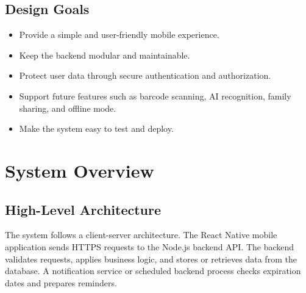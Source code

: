 \documentclass[12pt]{article}
\begin{document}
\subsection{Design Goals}
\begin{itemize}
    \item Provide a simple and user-friendly mobile experience.
    \item Keep the backend modular and maintainable.
    \item Protect user data through secure authentication and authorization.
    \item Support future features such as barcode scanning, AI recognition, family sharing, and offline mode.
    \item Make the system easy to test and deploy.
\end{itemize}

\section{System Overview}

\subsection{High-Level Architecture}
The system follows a client-server architecture. The React Native mobile application sends HTTPS requests to the Node.js backend API. The backend validates requests, applies business logic, and stores or retrieves data from the database. A notification service or scheduled backend process checks expiration dates and prepares reminders.

\begin{center}
\end{center}
\end{document}
